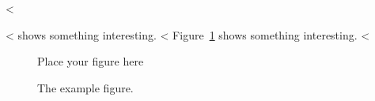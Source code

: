 <%

\begin{WSample}
<%
 shows something interesting.
<%
Figure~\ref{fig:label} shows something interesting.
<%

\begin{figure}
  \centering
  Place your figure here
  \caption{The example figure.}
  \label{fig:label}
\end{figure}
\end{WSample}
\PexaShowBoth{}

